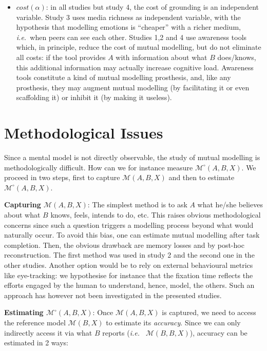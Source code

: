 \documentclass[natbib]{svjour3}
\newcommand{\ie}{{\textit{i.e.\ }}}
\newcommand{\model}[3]{{$\mathcal{M}(#1, #2, #3)$}}
\newcommand{\refmodel}[2]{{$\mathcal{M}(#1, #2)$}}
\newcommand{\Model}[3]{{$\mathcal{M}^{\circ}(#1, #2, #3)$}}
\begin{document}
\begin{itemize}
    \item $cost(\alpha)$: in all studies but study 4, the cost of  grounding is
        an independent variable. Study 3 uses media richness as independent
        variable, with the hypothesis that modelling emotions is ``cheaper'' with a
        richer medium, \ie  when peers can see each other.  Studies 1,2 and 4
        use awareness tools which, in principle, reduce the cost of mutual modelling, but do
        not eliminate all costs: if the tool provides $A$ with information about
        what $B$ does/knows, this additional information may actually increase
        cognitive load. Awareness tools constitute a kind of mutual modelling prosthesis,
        and, like any prosthesis, they may augment mutual modelling (by facilitating it or
        even scaffolding it) or inhibit it (by making it useless).

\end{itemize}


\section{Methodological Issues}

Since a mental model is not directly observable,  the study of mutual modelling
is methodologically difficult. How can we for instance measure \Model{A}{B}{X}.
We proceed in two steps, first to capture \model{A}{B}{X} and then to estimate
\Model{A}{B}{X}. 

{\bf Capturing \model{A}{B}{X}}: The simplest method is to ask $A$ what he/she
believes about what $B$ knows, feels, intends to do, etc.  This raises obvious
methodological concerns since such a question triggers a modelling process
beyond what would naturally occur. To avoid this bias, one can estimate mutual
modelling after task completion.  Then, the obvious drawback are memory losses
and by post-hoc reconstruction.  The first method was used in study 2 and the
second one in the other studies. Another option would be to rely on external
behavioural metrics like eye-tracking: we hypothesise for instance that the
fixation time reflects the efforts engaged by the human to understand, hence,
model, the others. Such an approach has however not been investigated in the
presented studies.

{\bf Estimating \Model{A}{B}{X}}: Once \model{A}{B}{X} is captured, we need to
access the reference model \refmodel{B}{X} to estimate its \emph{accuracy}.
Since we can only indirectly access it via what $B$ reports (\ie
\model{B}{B}{X}), accuracy can be estimated in 2 ways:
\end{document}
